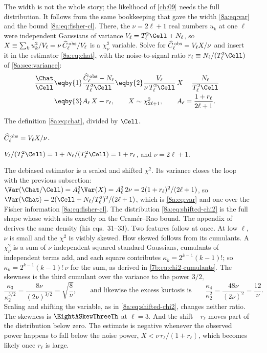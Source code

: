 The width is not the whole story; the likelihood of \cref{ch:09} needs the full distribution.
It follows from the same bookkeeping that gave the width \eqref{8a:eq:var} and the bound
\eqref{8a:eq:fisher-cl}. There, the $\nu=2\ell+1$ real numbers $u_k$ at one $\ell$ were independent
Gaussians of variance $V_\ell=T_\ell^2\Cell+N_\ell$, so
$X\equiv\sum_ku_k^2/V_\ell=\nu\,\widehat C^{\,\rm obs}_\ell/V_\ell$ is a $\chi^2_\nu$ variable. Solve
for $\widehat C^{\,\rm obs}_\ell=V_\ell X/\nu$ and insert it in the estimator \eqref{8a:eq:chat},
with the noise-to-signal ratio $r_\ell\equiv N_\ell/(T_\ell^2\Cell)$ of \cref{8a:sec:variance}:
\begin{align}
  \frac{\Chat}{\Cell}
  &\eqby{1}\frac{\widehat C^{\,\rm obs}_\ell-N_\ell}{T_\ell^2\Cell}
   \eqby{2}\frac{V_\ell}{\nu\,T_\ell^2\Cell}\,X-\frac{N_\ell}{T_\ell^2\Cell}
   \nonumber\\
  &\eqby{3}A_\ell\,X-r_\ell,
  \qquad X\sim\chi^2_{2\ell+1},
  \qquad A_\ell=\frac{1+r_\ell}{2\ell+1}.
  \label{8a:eq:shifted-chi2}
\end{align}
\begin{explain}
  \item The definition \eqref{8a:eq:chat}, divided by $\Cell$.
  \item $\widehat C^{\,\rm obs}_\ell=V_\ell X/\nu$.
  \item $V_\ell/(T_\ell^2\Cell)=1+N_\ell/(T_\ell^2\Cell)=1+r_\ell$, and $\nu=2\ell+1$.
\end{explain}
The debiased estimator is a scaled and shifted $\chi^2$. Its variance closes the loop with the
previous subsection: $\Var(\Chat/\Cell)=A_\ell^2\Var(X)=A_\ell^2\,2\nu=2(1+r_\ell)^2/(2\ell+1)$, so
$\Var(\Chat)=2(\Cell+N_\ell/T_\ell^2)^2/(2\ell+1)$, which is \eqref{8a:eq:var} and one over the
Fisher information \eqref{8a:eq:fisher-cl}. The distribution \eqref{8a:eq:shifted-chi2} is the
full shape whose width sits exactly on the Cram\'er--Rao bound. The appendix of
\textcite{Knox1995} derives the same density (his eqs.~31--33). Two features follow at once.
At low $\ell$, $\nu$ is small and the $\chi^2$ is visibly skewed. How skewed follows from its
cumulants. A $\chi^2_\nu$ is a sum of $\nu$ independent squared standard Gaussians, cumulants of
independent terms add, and each square contributes $\kappa_k=2^{k-1}(k-1)!$; so
$\kappa_k=2^{k-1}(k-1)!\,\nu$ for the sum, as derived in \eqref{7b:eq:chi2-cumulants}. The
skewness is the third cumulant over the variance to the power $3/2$,
\begin{equation}
  \frac{\kappa_3}{\kappa_2^{3/2}}=\frac{8\nu}{(2\nu)^{3/2}}=\sqrt{\frac8\nu},
  \qquad\text{and likewise the excess kurtosis is}\qquad
  \frac{\kappa_4}{\kappa_2^2}=\frac{48\nu}{(2\nu)^2}=\frac{12}{\nu}.
  \label{8a:eq:chi2-shape}
\end{equation}
Scaling and shifting the variable, as in \eqref{8a:eq:shifted-chi2}, changes neither ratio. The
skewness is $\EightASkewThreeTh$ at $\ell=3$. And the shift $-r_\ell$ moves part of
the distribution below zero. The estimate is negative whenever the observed power happens to
fall below the noise power, $X<\nu\,r_\ell/(1+r_\ell)$, which becomes likely once $r_\ell$ is
large.

